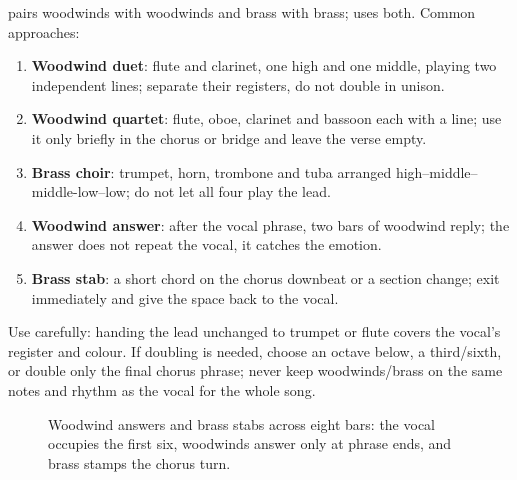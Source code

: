  pairs woodwinds with woodwinds and brass with brass;  uses both. Common approaches:

\begin{enumerate}
\item \textbf{Woodwind duet}: flute and clarinet, one high and one middle, playing two independent lines; separate their registers, do not double in unison.
\item \textbf{Woodwind quartet}: flute, oboe, clarinet and bassoon each with a line; use it only briefly in the chorus or bridge and leave the verse empty.
\item \textbf{Brass choir}: trumpet, horn, trombone and tuba arranged high--middle--middle-low--low; do not let all four play the lead.
\item \textbf{Woodwind answer}: after the vocal phrase, two bars of woodwind reply; the answer does not repeat the vocal, it catches the emotion.
\item \textbf{Brass stab}: a short chord on the chorus downbeat or a section change; exit immediately and give the space back to the vocal.
\end{enumerate}

Use  carefully: handing the lead unchanged to trumpet or flute covers the vocal's register and colour. If doubling is needed, choose an octave below, a third/sixth, or double only the final chorus phrase; never keep woodwinds/brass on the same notes and rhythm as the vocal for the whole song.

\begin{figure}[htbp]
  \centering
  \caption{Woodwind answers and brass stabs across eight bars: the vocal occupies the first six, woodwinds answer only at phrase ends, and brass stamps the chorus turn.}
  \label{fig:winds-brass-entry}
\end{figure}

